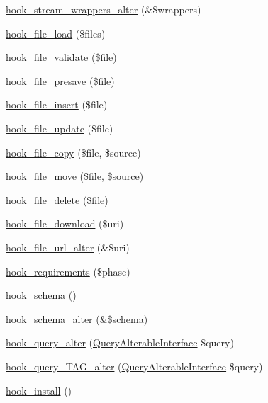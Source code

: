 \begin{DoxyCompactItemize}
\item 
\hyperlink{group__hooks_gab7e34e537f28b019b04ab1b1d90d52c1}{hook\_\-stream\_\-wrappers\_\-alter} (\&\$wrappers)
\item 
\hyperlink{group__hooks_ga9f6bf6919600b83a565421f6a7faf678}{hook\_\-file\_\-load} (\$files)
\item 
\hyperlink{group__hooks_gab1491b52a117229913448d787156e013}{hook\_\-file\_\-validate} (\$file)
\item 
\hyperlink{group__hooks_ga7350980f3f4679989f9c5aa2b7f0df05}{hook\_\-file\_\-presave} (\$file)
\item 
\hyperlink{group__hooks_gac40fa27583fc4cba927f486098eaa79b}{hook\_\-file\_\-insert} (\$file)
\item 
\hyperlink{group__hooks_ga604abda1f5df3f041f7ef748b9762475}{hook\_\-file\_\-update} (\$file)
\item 
\hyperlink{group__hooks_ga49e2e5f9993e98da69c3434999242711}{hook\_\-file\_\-copy} (\$file, \$source)
\item 
\hyperlink{group__hooks_ga7053514a7a923b43960b31cacfa9ce95}{hook\_\-file\_\-move} (\$file, \$source)
\item 
\hyperlink{group__hooks_gafa88683ad014451b3fbc9ca9bb80afdd}{hook\_\-file\_\-delete} (\$file)
\item 
\hyperlink{group__hooks_gab73f0e658d6630220ba7836ccd011ecc}{hook\_\-file\_\-download} (\$uri)
\item 
\hyperlink{group__hooks_ga996bb014bd4944c0e468c1525768a96c}{hook\_\-file\_\-url\_\-alter} (\&\$uri)
\item 
\hyperlink{group__hooks_ga3cff06c700ccb873cfce71fc378e7675}{hook\_\-requirements} (\$phase)
\item 
\hyperlink{group__schemaapi_ga9abd926ddaf68a22e6dca28a25d0c6f5}{hook\_\-schema} ()
\item 
\hyperlink{group__schemaapi_ga4a00aaeabd6903f707d8385476b9ae2a}{hook\_\-schema\_\-alter} (\&\$schema)
\item 
\hyperlink{group__hooks_gaf166f6375e9f7b5919d719eb91198d47}{hook\_\-query\_\-alter} (\hyperlink{interfaceQueryAlterableInterface}{QueryAlterableInterface} \$query)
\item 
\hyperlink{group__hooks_ga12527037deeb76adcab1000e984fdfce}{hook\_\-query\_\-TAG\_\-alter} (\hyperlink{interfaceQueryAlterableInterface}{QueryAlterableInterface} \$query)
\item 
\hyperlink{group__hooks_ga1ecdb5a2a046ea63dc790c3ed90338e5}{hook\_\-install} ()
\item 

\end{DoxyCompactItemize}
